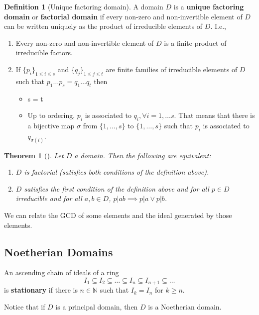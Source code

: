 \documentclass[12pt,a4paper]{article}
\newtheorem{theorem}{Theorem}[section]
\theoremstyle{definition}
\newtheorem{definition}{Definition}[section]
\begin{document}
\begin{definition}[Unique factoring domain]
A domain $D$ is a \textbf{unique factoring domain} or \textbf{factorial domain} if every non-zero and non-invertible element of $D$ can be written uniquely as the product of irreducible elements of $D$. I.e.,
\begin{enumerate}
\item Every non-zero and non-invertible element of $D$ is a finite product of irreducible factors.
\item If $\{ p_i \}_{1 \leq i \leq s}$ and $\{ q_j \}_{1 \leq j \leq t}$ are finite families of irreducible elements of $D$ such that $p_1 \ldots p_s = q_1 \ldots q_t$ then
\begin{itemize}
\item s = t
\item Up to ordering, $p_i$ is associated to $q_i, \forall i = 1, \ldots s$. That means that there is a bijective map $\sigma$ from $\{ 1, \ldots, s \}$ to $\{ 1, \ldots, s \}$ such that $p_i$ is associated to $q_{\sigma (i)}$.
\end{itemize}
\end{enumerate}
\end{definition}

\begin{theorem}[]
Let $D$ a domain. Then the following are equivalent:
\begin{enumerate}
\item $D$ is factorial (satisfies both conditions of the definition above).
\item $D$ satisfies the first condition of the definition above and for all $p \in D$ irreducible and for all $a,b \in D$, $p | ab \implies p | a \lor p| b$.
\end{enumerate}
\end{theorem}

We can relate the GCD of some elements and the ideal generated by those elements.

\subsection{Noetherian Domains}

An ascending chain of ideals of a ring
\[
I_1 \subseteq I_2 \subseteq \ldots \subseteq I_n \subseteq I_{n+1} \subseteq \ldots
\]
is \textbf{stationary} if there is $n \in \mathbb{N}$ such that $I_k = I_n$ for $k \geq n$.

Notice that if $D$ is a principal domain, then $D$ is a Noetherian domain.
\end{document}
